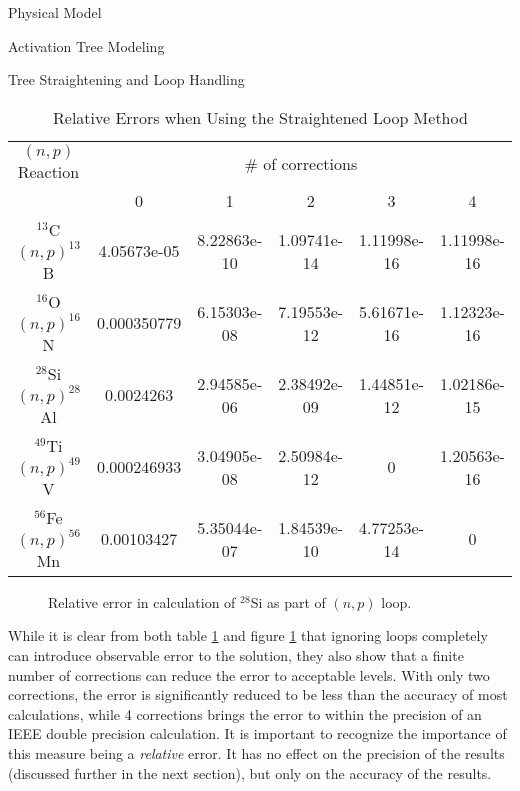 \begin{chapter}{Physical Model\label{chap:physical}}
\begin{section}{Activation Tree Modeling\label{sec:physical.chains}}
\begin{subsection}{Tree Straightening and Loop Handling\label{sec:physical.chains.loops}}
    \begin{table}
      \begin{center}
        \caption{Relative Errors when Using the Straightened Loop
          Method}\label{tab:physical.loop_error}
        \begin{tabular}{|c|c|c|c|c|c|} \hline
          $(n,p)$ Reaction & \multicolumn{5}{c|}{\# of
            corrections}\\\cline{2-6}
          & 0 & 1 & 2 & 3 & 4 \\\hline\hline
          $^{13}$C$(n,p)^{13}$B & 4.05673e-05 & 8.22863e-10 & 1.09741e-14 &
          1.11998e-16 & 1.11998e-16\\\hline
          $^{16}$O$(n,p)^{16}$N & 0.000350779 & 6.15303e-08 & 7.19553e-12 &
          5.61671e-16 & 1.12323e-16 \\\hline
          $^{28}$Si$(n,p)^{28}$Al & 0.0024263 & 2.94585e-06 & 2.38492e-09 &
          1.44851e-12 & 1.02186e-15 \\\hline
          $^{49}$Ti$(n,p)^{49}$V & 0.000246933 & 3.04905e-08 & 2.50984e-12 & 0 &
          1.20563e-16\\\hline
          $^{56}$Fe$(n,p)^{56}$Mn & 0.00103427 & 5.35044e-07 & 1.84539e-10 &
          4.77253e-14 & 0\\\hline\hline
        \end{tabular}
      \end{center}
    \end{table}
    
    \begin{figure}[htbp]
      \begin{center}
        \leavevmode
        \caption{Relative error in calculation of $^{28}$Si as part of $(n,p)$ loop.}
        \label{fig:physical.loop_error}
      \end{center}
    \end{figure}

    While it is clear from both table \ref{tab:physical.loop_error}
    and figure \ref{fig:physical.loop_error} that ignoring loops
    completely can introduce observable error to the solution, they
    also show that a finite number of corrections can reduce the error
    to acceptable levels.  With only two corrections, the error is
    significantly reduced to be less than the accuracy of most
    calculations, while 4 corrections brings the error to within the
    precision of an IEEE double precision calculation.  It is
    important to recognize the importance of this measure being a
    \textsl{relative} error.  It has no effect on the precision of the
    results (discussed further in the next section), but only on the
    accuracy of the results.
    

\end{subsection}
\end{section}
\end{chapter}
